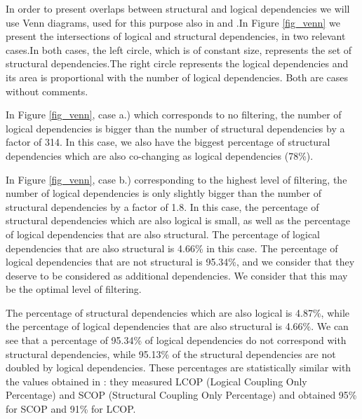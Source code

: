 \documentclass[a4paper,twoside]{article}
\begin{document}
In order to present overlaps between structural and logical dependencies we will use Venn diagrams, used for this purpose also in \cite{Oliva:2011:ISL:2067853.2068086} and \cite{DBLP:journals/jss/AjienkaC17}.In Figure \ref{fig_venn} we present the intersections of logical and structural dependencies, in two relevant cases.In both cases, the left circle, which is of constant size, represents the set of structural dependencies.The right circle represents the logical dependencies and its area is proportional with the number of logical dependencies. Both are cases without comments.

In Figure \ref{fig_venn}, case a.) which corresponds to no filtering, the number of logical dependencies is bigger than the number of structural dependencies by a factor of 314. In this case, we also have the biggest percentage of structural dependencies which are also co-changing as logical dependencies (78\%). %

In Figure \ref{fig_venn}, case b.) corresponding to the highest level of filtering, the number of logical dependencies is only slightly bigger than the number of structural dependencies by a factor of 1.8. In this case, the percentage of structural dependencies which are also logical is small, as well as the percentage of logical dependencies that are also structural.  The percentage of logical dependencies that are also structural is 4.66\% in this case. The percentage of logical dependencies that are not structural is 95.34\%, and we consider that they deserve to be considered as additional dependencies.
We consider that this may be the optimal level of filtering. 

The percentage of structural dependencies which are also logical is 4.87\%,  while the percentage of logical dependencies that are also structural is 4.66\%. We can see that a percentage of 95.34\% of logical dependencies do not correspond with structural dependencies, while 95.13\% of the structural dependencies are not doubled by logical dependencies. These percentages are statistically similar with the values obtained in \cite{Oliva:2011:ISL:2067853.2068086}: they measured LCOP (Logical Coupling Only Percentage)  and SCOP (Structural Coupling Only Percentage) and obtained 95\% for SCOP and 91\% for LCOP. 
\end{document}

